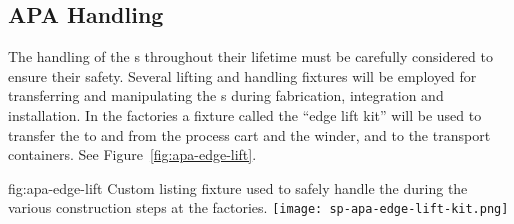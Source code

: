 

\subsection{APA Handling}
\label{sec:fdsp-apa-transport-handling}

The handling of the s throughout their lifetime must be carefully considered to ensure their safety.  Several lifting and handling fixtures will be employed for transferring and manipulating the s during fabrication, integration and installation.  In the factories a fixture called the ``edge lift kit'' will be used to transfer the  to and from the process cart and the winder, and to the transport containers.  See Figure~\ref{fig:apa-edge-lift}.  %

\begin{dunefigure}{fig:apa-edge-lift}
{Custom listing fixture used to safely handle the  during the various construction steps at the factories.}  
\texttt{[image: sp-apa-edge-lift-kit.png]} 
\end{dunefigure}






